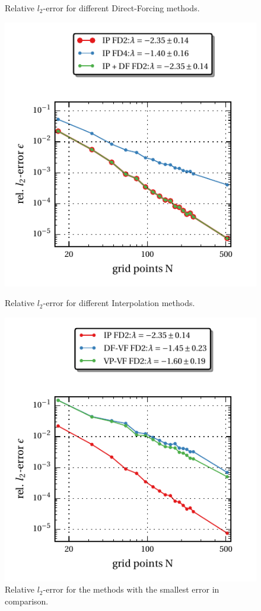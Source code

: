 \begin{figure}[!bp]
\begin{minipage}[c]{0.45\textwidth}
      \caption{\label{vali:hp_flow_gc_df}
          Relative $l_2$-error for different Direct-Forcing methods.}
  \end{minipage}
  \begin{minipage}[c]{0.45\textwidth}
      \includegraphics{gfx/immersed_boundary/hpflow/theo/ip.pdf}
      \caption{\label{vali:hp_flow_gc_ip}
          Relative $l_2$-error for different Interpolation methods.}
  \end{minipage}
  \hfill
  \begin{minipage}[c]{0.45\textwidth}
      \includegraphics{gfx/immersed_boundary/hpflow/theo/all.pdf}
      \caption{\label{vali:hp_flow_gc_all}
          Relative $l_2$-error for the methods with the smallest error in comparison.}
  \end{minipage}
\end{figure}

